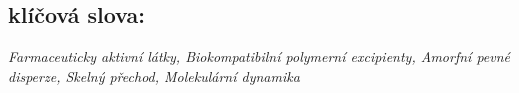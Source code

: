 \subsection*{klíčová slova:}
\textit{Farmaceuticky aktivní látky, Biokompatibilní polymerní excipienty, Amorfní pevné disperze, Skelný přechod, Molekulární dynamika}


\newpage
\thispagestyle{empty}
\tableofcontents

